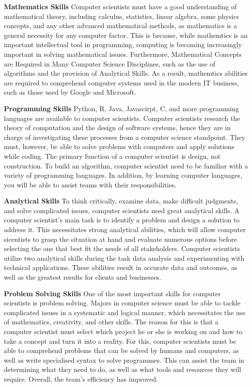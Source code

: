 \documentclass[a4paper, 11pt]{report}
\begin{document}
\textbf{Mathematics Skills}
Computer scientists must have a good understanding of mathematical theory, including calculus, statistics, linear algebra, some physics concepts, and any other advanced mathematical methods, as mathematics is a general necessity for any computer factor. This is because, while mathemtics is an important intellectual tool in programming, computing is becoming increasingly important in solving mathematical issues. Furthermore, Mathematical Concepts are Required in Many Computer Science Disciplines, such as the use of algorithms and the provision of Analytical Skills. As a result, mathemtics abilities are required to comprehend computer systems used in the modern IT business, such as those used by Google and Microsoft.

\textbf{Programming Skills}
Python, R, Java, Javascirpt, C, and more programming languages are available to computer scientists. Computer scientists research the theory of computation and the design of software systems, hence they are in charge of investigating these processes from a computer science standpoint. They must, however, be able to solve problems with computers and apply solutions while coding. The primary function of a computer scientist is design, not construction. To build an algorithm, computer scientist need to be familiar with a variety of programming languages. In addition, by learning computer languages, you will be able to assist teams with their responsibilities.

\textbf{Analytical Skills}
To think critically, examine data, make difficult judgments, and solve complicated issues, computer scientists need great analytical skills. A computer scientist's main task is to identify a problem and design a solution to address it. This necessitates strong analytical abilities, which will allow computer sicentists to grasp the situation at hand and evaluate numerous options before selecting the one that best fit the needs of all stakeholders. Computer scientists utilize two analytical skills during the task data analysis and experimenting with technical applications. These abilities result in accurate data and outcomes, as well as the greatest results for clients and businesses.

\textbf{Problem Solving Skills}
One of the most important skills for computer scientists is problem solving. Majors in computer science must be able to tackle complicated issues in a systematic and logical manner, which necessitates the use of mathematics, creativity, and other skills. The reason for this is that a computer scientist must select which project he or she is working on and how to take a concept and turn it into a reality. For this, computer scientists must be able to comprehend problems that can be solved by humans and computers, as well as write specialised syntax to solve programmes. This can assist the team in determining what they need to do, as well as what tools and resources they will require. Overall, the team's efficiency has improved.
\end{document}
